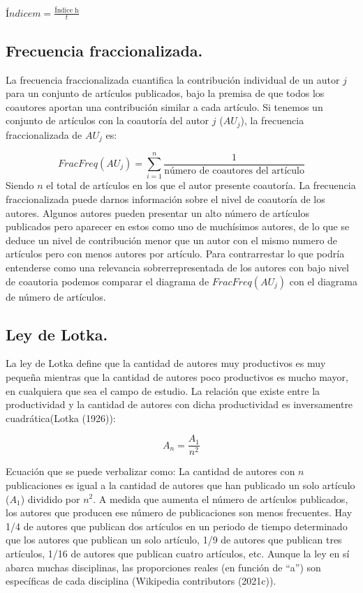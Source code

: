\documentclass[
]{article}
\begin{document}
\(Índice m=\frac{\text{Índice h}}{t}\)

\hypertarget{frecuencia-fraccionalizada.}{%
\subsection{Frecuencia
fraccionalizada.}\label{frecuencia-fraccionalizada.}}

La frecuencia fraccionalizada cuantifica la contribución individual de
un autor \(j\) para un conjunto de artículos publicados, bajo la premisa
de que todos los coautores aportan una contribución similar a cada
artículo. Si tenemos un conjunto de artículos con la coautoría del autor
\(j\) (\(AU_j\)), la frecuencia fraccionalizada de \(AU_j\) es:

\[
FracFreq(AU_j)=\sum_{i=1}^n{\frac{1}{\text{número de coautores del artículo}}}
\] Siendo \(n\) el total de artículos en los que el autor presente
coautoría. La frecuencia fraccionalizada puede darnos información sobre
el nivel de coautoría de los autores. Algunos autores pueden presentar
un alto número de artículos publicados pero aparecer en estos como uno
de muchísimos autores, de lo que se deduce un nivel de contribución
menor que un autor con el mismo numero de artículos pero con menos
autores por artículo. Para contrarrestar lo que podría entenderse como
una relevancia sobrerrepresentada de los autores con bajo nivel de
coautoria podemos comparar el diagrama de \(FracFreq(AU_j)\) con el
diagrama de número de artículos.

\hypertarget{ley-de-lotka.}{%
\subsection{Ley de Lotka.}\label{ley-de-lotka.}}

La ley de Lotka define que la cantidad de autores muy productivos es muy
pequeña mientras que la cantidad de autores poco productivos es mucho
mayor, en cualquiera que sea el campo de estudio. La relación que existe
entre la productividad y la cantidad de autores con dicha productividad
es inversamentre cuadrática(Lotka (1926)):

\[
A_n=\frac{A_1}{n^2}
\]

Ecuación que se puede verbalizar como: La cantidad de autores con \(n\)
publicaciones es igual a la cantidad de autores que han publicado un
solo artículo (\(A_1\)) dividido por \(n^2\). A medida que aumenta el
número de artículos publicados, los autores que producen ese número de
publicaciones son menos frecuentes. Hay 1/4 de autores que publican dos
artículos en un periodo de tiempo determinado que los autores que
publican un solo artículo, 1/9 de autores que publican tres artículos,
1/16 de autores que publican cuatro artículos, etc. Aunque la ley en sí
abarca muchas disciplinas, las proporciones reales (en función de ``a'')
son específicas de cada disciplina (Wikipedia contributors (2021c)).
\end{document}
